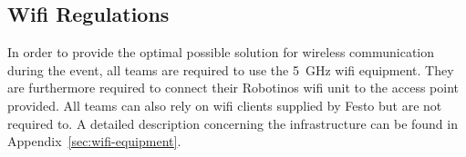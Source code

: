 \documentclass[12pt,twoside]{article}
\begin{document}
\subsection{Wifi Regulations}
\label{sec:wifi-regulations}
In order to provide the optimal possible solution for wireless
communication during the event, all teams are required to use the
\SI{5}{\giga\hertz} wifi equipment. They are furthermore required to
connect their Robotinos wifi unit to the access point provided. All
teams can also rely on wifi clients supplied by Festo but are not
required to. A detailed description concerning the infrastructure can
be found in Appendix~\ref{sec:wifi-equipment}.











\end{document}
